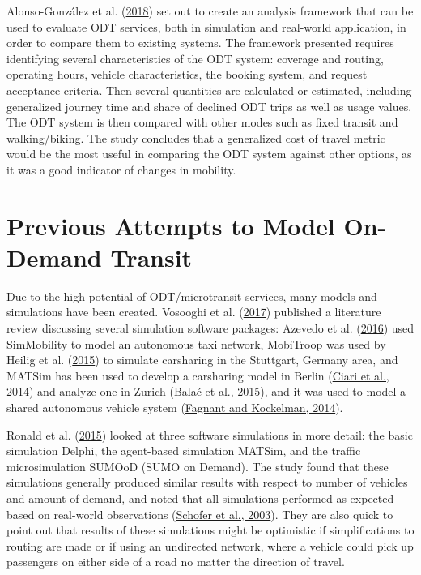 \documentclass[
]{report}
\begin{document}
Alonso-González et al. (\protect\hyperlink{ref-Alonso-Gonzalez2018}{2018}) set out to create an analysis framework that can be used to evaluate ODT services, both in simulation and real-world application, in order to compare them to existing systems. The framework presented requires identifying several characteristics of the ODT system: coverage and routing, operating hours, vehicle characteristics, the booking system, and request acceptance criteria. Then several quantities are calculated or estimated, including generalized journey time and share of declined ODT trips as well as usage values. The ODT system is then compared with other modes such as fixed transit and walking/biking. The study concludes that a generalized cost of travel metric would be the most useful in comparing the ODT system against other options, as it was a good indicator of changes in mobility.

\hypertarget{previous-attempts-to-model-on-demand-transit}{%
\section{Previous Attempts to Model On-Demand Transit}\label{previous-attempts-to-model-on-demand-transit}}

Due to the high potential of ODT/microtransit services, many models and simulations have been created. Vosooghi et al. (\protect\hyperlink{ref-Vosooghi2017}{2017}) published a literature review discussing several simulation software packages: Azevedo et al. (\protect\hyperlink{ref-Azevedo2016}{2016}) used SimMobility to model an autonomous taxi network, MobiTroop was used by Heilig et al. (\protect\hyperlink{ref-Heilig2015}{2015}) to simulate carsharing in the Stuttgart, Germany area, and MATSim has been used to develop a carsharing model in Berlin (\protect\hyperlink{ref-Ciari2014}{Ciari et al., 2014}) and analyze one in Zurich (\protect\hyperlink{ref-Balac2015}{Balać et al., 2015}), and it was used to model a shared autonomous vehicle system (\protect\hyperlink{ref-Fagnant2014}{Fagnant and Kockelman, 2014}).

Ronald et al. (\protect\hyperlink{ref-Ronald2015}{2015}) looked at three software simulations in more detail: the basic simulation Delphi, the agent-based simulation MATSim, and the traffic microsimulation SUMOoD (SUMO on Demand). The study found that these simulations generally produced similar results with respect to number of vehicles and amount of demand, and noted that all simulations performed as expected based on real-world observations (\protect\hyperlink{ref-Schofer2003}{Schofer et al., 2003}). They are also quick to point out that results of these simulations might be optimistic if simplifications to routing are made or if using an undirected network, where a vehicle could pick up passengers on either side of a road no matter the direction of travel.
\end{document}
